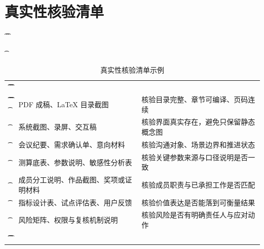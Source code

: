 \section{真实性核验清单}

\begin{table}[htbp]
	\t\centering
	\t\caption{真实性核验清单示例}
	\t\begin{tabularx}{\textwidth}{|L{4cm}L{3cm}Y|}
		\t\t\hline
		\t\t{} &     &       \\
		\t\t\hline
		\t\t{}
		\t{}    & PDF 成稿、LaTeX 目录截图   & 核验目录完整、章节可编译、页码连续   \\
		\t{}      & 系统截图、录屏、交互稿         & 核验界面真实存在，避免只保留静态概念图 \\
		\t{}       & 会议纪要、需求确认单、意向材料     & 核验沟通对象、场景边界和推进状态    \\
		\t{}      & 测算底表、参数说明、敏感性分析表    & 核验关键参数来源与口径说明是否一致   \\
		\t{}         & 成员分工说明、作品截图、奖项或证明材料 & 核验成员职责与已承担工作是否匹配    \\
		\t{}       & 指标设计表、试点评估表、用户反馈    & 核验价值表达是否能落到可衡量结果    \\
		\t{}        & 风险矩阵、权限与复核机制说明      & 核验风险是否有明确责任人与应对动作   \\
		\t\t\hline
		\t\end{tabularx}
\end{table}
